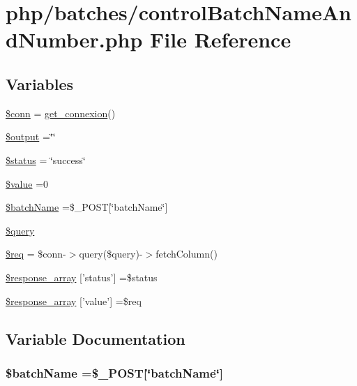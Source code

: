 \hypertarget{control_batch_name_and_number_8php}{\section{php/batches/control\-Batch\-Name\-And\-Number.php File Reference}
\label{control_batch_name_and_number_8php}
}
\subsection*{Variables}
\begin{DoxyCompactItemize}
\item 
\hyperlink{control_batch_name_and_number_8php_aa8a5a87b9c1a6a0819b88447cbe41877}{\$conn} = \hyperlink{php__functions_8php_ace18bc10f3fd08f92688ac743e0d8c2e}{get\-\_\-connexion}()
\item 
\hyperlink{control_batch_name_and_number_8php_a73004ce9cd673c1bfafd1dc351134797}{\$output} =\char`\"{}\char`\"{}
\item 
\hyperlink{control_batch_name_and_number_8php_a58391ea75f2d29d5d708d7050b641c33}{\$status} = \char`\"{}success\char`\"{}
\item 
\hyperlink{control_batch_name_and_number_8php_a0f298096f322952a72a50f98a74c7b60}{\$value} =0
\item 
\hyperlink{control_batch_name_and_number_8php_ae0139f42f02473374ecb453f87c66534}{\$batch\-Name} =\$\-\_\-\-P\-O\-S\-T\mbox{[}\char`\"{}batch\-Name\char`\"{}\mbox{]}
\item 
\hyperlink{control_batch_name_and_number_8php_af59a5f7cd609e592c41dc3643efd3c98}{\$query}
\item 
\hyperlink{control_batch_name_and_number_8php_a63a7a283ea5dee8af1e2d5a3435bf370}{\$req} = \$conn-\/$>$query(\$query)-\/$>$fetch\-Column()
\item 
\hyperlink{control_batch_name_and_number_8php_acd0903a7a32e8397aefd0ce8b7dbd1ab}{\$response\-\_\-array} \mbox{[}'status'\mbox{]} =\$status
\item 
\hyperlink{control_batch_name_and_number_8php_abbcbb7142adc1824bb5531445d2de0f0}{\$response\-\_\-array} \mbox{[}'value'\mbox{]} =\$req
\end{DoxyCompactItemize}


\subsection{Variable Documentation}
\hypertarget{control_batch_name_and_number_8php_ae0139f42f02473374ecb453f87c66534}{
\subsubsection[{\$batch\-Name}]{\setlength{\rightskip}{0pt plus 5cm}\${\bf batch\-Name} =\$\-\_\-\-P\-O\-S\-T\mbox{[}\char`\"{}batch\-Name\char`\"{}\mbox{]}}}\label{control_batch_name_and_number_8php_ae0139f42f02473374ecb453f87c66534}


